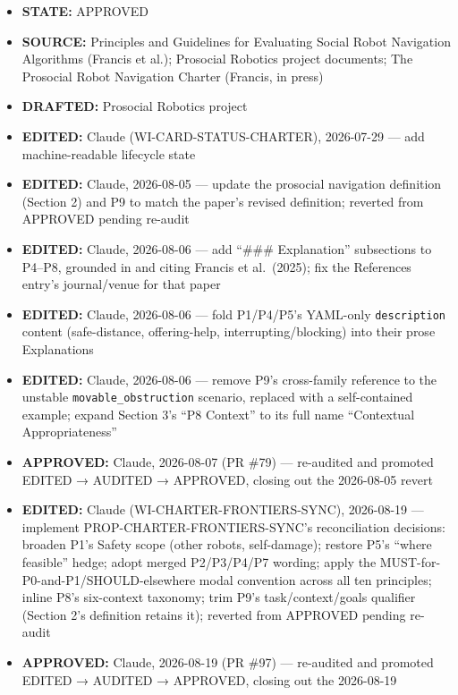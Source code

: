 \documentclass[utf8]{frontiers_suppmat} %
\providecommand{\tightlist}{%
  \setlength{\itemsep}{0pt}\setlength{\parskip}{0pt}}
\begin{document}
\begin{itemize}
\tightlist
\item
  \textbf{STATE:} APPROVED
\item
  \textbf{SOURCE:} Principles and Guidelines for Evaluating Social Robot
  Navigation Algorithms (Francis et al.); Prosocial Robotics project
  documents; The Prosocial Robot Navigation Charter (Francis, in press)
\item
  \textbf{DRAFTED:} Prosocial Robotics project
\item
  \textbf{EDITED:} Claude (WI-CARD-STATUS-CHARTER), 2026-07-29 --- add
  machine-readable lifecycle state
\item
  \textbf{EDITED:} Claude, 2026-08-05 --- update the prosocial
  navigation definition (Section 2) and P9 to match the paper's revised
  definition; reverted from APPROVED pending re-audit
\item
  \textbf{EDITED:} Claude, 2026-08-06 --- add ``\#\#\# Explanation''
  subsections to P4--P8, grounded in and citing Francis et al.~(2025);
  fix the References entry's journal/venue for that paper
\item
  \textbf{EDITED:} Claude, 2026-08-06 --- fold P1/P4/P5's YAML-only
  \texttt{description} content (safe-distance,
  offering-help, interrupting/blocking) into their prose Explanations
\item
  \textbf{EDITED:} Claude, 2026-08-06 --- remove P9's cross-family
  reference to the unstable
  \texttt{movable\_obstruction} scenario, replaced with
  a self-contained example; expand Section 3's ``P8 Context'' to its
  full name ``Contextual Appropriateness''
\item
  \textbf{APPROVED:} Claude, 2026-08-07 (PR \#79) --- re-audited and
  promoted EDITED → AUDITED → APPROVED, closing out the 2026-08-05
  revert
\item
  \textbf{EDITED:} Claude (WI-CHARTER-FRONTIERS-SYNC), 2026-08-19 ---
  implement PROP-CHARTER-FRONTIERS-SYNC's reconciliation decisions:
  broaden P1's Safety scope (other robots, self-damage); restore P5's
  ``where feasible'' hedge; adopt merged P2/P3/P4/P7 wording; apply the
  MUST-for-P0-and-P1/SHOULD-elsewhere modal convention across all ten
  principles; inline P8's six-context taxonomy; trim P9's
  task/context/goals qualifier (Section 2's definition retains it);
  reverted from APPROVED pending re-audit
\item
  \textbf{APPROVED:} Claude, 2026-08-19 (PR \#97) --- re-audited and
  promoted EDITED → AUDITED → APPROVED, closing out the 2026-08-19

\end{itemize}
\end{document}
